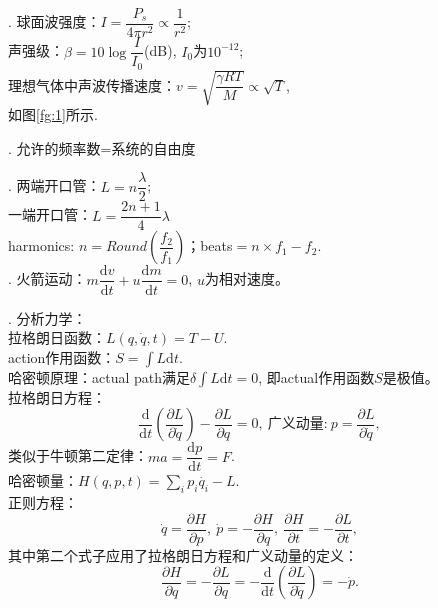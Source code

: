 \documentclass[12pt, 
]{article}
\begin{document}
. 球面波强度：$I=\dfrac{P_s}{4\pi r^2}\propto\dfrac{1}{r^2}$; ~\\\phantom{~~~~~}声强级：$\beta=10\log\dfrac{I}{I_0}$(dB), $I_0$为$10^{-12}$;~\\
\phantom{~~~~~}理想气体中声波传播速度：$v=\sqrt{\dfrac{\gamma RT}{M}}\propto\sqrt{T}$, \\\phantom{~~~~~}如图\ref{fg:1}所示.

. 允许的频率数=系统的自由度~\\
\begin{figure}
\vspace{-1cm}
\hspace{0.8cm}
\end{figure}

. 两端开口管：$L=n\dfrac{\lambda}{2}$;
\\\phantom{~~~~}一端开口管：$L=\dfrac{2n+1}{4}\lambda$
\\\phantom{~~~~}harmonics: $n=Round\left(\dfrac{f_2}{f_1}\right)$；beats$=n\times f_1-f_2$.
~\\

. 火箭运动：$m\dfrac{\mathrm{d}v}{\mathrm{d}t}+u\dfrac{\mathrm{d}m}{\mathrm{d}t}=0$, $u$为相对速度。~\\

. 分析力学：
~\\\phantom{~~~~}拉格朗日函数：$L(q,\dot{q},t)=T-U$.
~\\\phantom{~~~~}action作用函数：$S=\displaystyle\int L\mathrm{d}t$.
~\\\phantom{~~~~}哈密顿原理：actual path满足$\delta\displaystyle\int L\mathrm{d}t=0$, 即actual作用函数$S$是极值。
~\\\phantom{~~~~}拉格朗日方程：
\[
	\frac{\mathrm{d}}{\mathrm{d}t}\left(\frac{\partial L}{\partial\dot{q}}\right)-\frac{\partial L}{\partial q}=0,~\text{广义动量:}~p=\frac{\partial L}{\partial\dot{q}},
\]
\phantom{~~~~}类似于牛顿第二定律：$ma=\dfrac{\mathrm{d}p}{\mathrm{d}t}=F$.
~\\\phantom{~~~~}哈密顿量：$H(q,p,t)=\displaystyle\sum_i p_i\dot{q_i}-L$.
~\\\phantom{~~~~}正则方程：
\[
	\dot{q}=\frac{\partial H}{\partial p},~\dot{p}=-\frac{\partial H}{\partial q},~\frac{\partial H}{\partial t}=-\frac{\partial L}{\partial t},
\]
\phantom{~~~~}其中第二个式子应用了拉格朗日方程和广义动量的定义：
$$\frac{\partial H}{\partial q}=-\frac{\partial L}{\partial q}=-\frac{\mathrm{d}}{\mathrm{d}t}\left(\frac{\partial L}{\partial\dot{q}}\right)=-\dot{p}.$$
\end{document}
